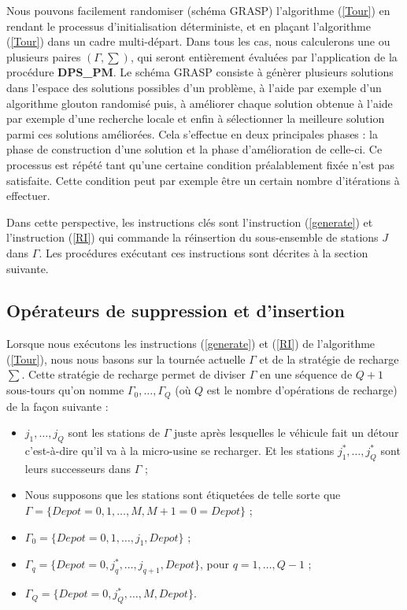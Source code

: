 {	
	Nous pouvons facilement randomiser (schéma GRASP) l'algorithme (\ref{Tour}) en rendant le processus d'initialisation déterministe, et en plaçant l'algorithme (\ref{Tour}) dans un cadre multi-départ. Dans tous les cas, nous calculerons une ou plusieurs paires $(\Gamma,\sum )$, qui seront entièrement évaluées par l'application de la procédure \textbf{DPS\_PM}. Le schéma GRASP consiste à génèrer plusieurs solutions dans l'espace des solutions possibles d'un problème, à l'aide par exemple d'un algorithme glouton randomisé puis, à améliorer chaque solution obtenue à l'aide par exemple d'une recherche locale et enfin à sélectionner la meilleure solution parmi ces solutions améliorées. Cela s'effectue en deux principales phases : la phase de
	construction d'une solution et la phase d'amélioration de celle-ci. Ce processus est répété
	tant qu'une certaine condition préalablement fixée n'est pas satisfaite. Cette condition
	peut par exemple être un certain nombre d'itérations à effectuer.
	
	Dans cette perspective, les instructions clés sont l'instruction (\ref{generate}) et l'instruction (\ref{RI}) qui commande la réinsertion du sous-ensemble de stations $J$ dans $\Gamma$. Les procédures exécutant ces instructions sont décrites à la section suivante.
	\subsection{Opérateurs de suppression et d'insertion}
	
	Lorsque nous exécutons les instructions (\ref{generate}) et (\ref{RI}) de l'algorithme (\ref{Tour}), nous nous basons sur la tournée actuelle $\Gamma$ et de la stratégie de recharge $\sum$. Cette stratégie de recharge permet de diviser $\Gamma$ en une séquence de $Q+1$ sous-tours qu'on nomme $\Gamma_0, \dots, \Gamma_Q$ (où $Q$ est le nombre d'opérations de recharge) de la façon suivante :
	\begin{itemize}[label=$\square$]
		\item $j_1, \dots, j_Q$ sont les stations de $\Gamma$ juste après lesquelles le véhicule fait un détour c'est-à-dire qu'il va à la micro-usine se recharger. Et les stations $j^*_1, \dots, j^*_Q$ sont leurs successeurs dans $\Gamma$ ;
		\item Nous supposons que les stations sont étiquetées de telle sorte que $\Gamma = \{Depot=0, 1, \dots, M, M+1=0=Depot \}$ ;
		\item $\Gamma_0 = \{Depot=0, 1, \dots, j_1, Depot\}$ ;
		\item $\Gamma_q = \{Depot=0, j^*_q, \dots, j_{q+1}, Depot\}$, pour $q=1, \dots, Q-1$ ;
		\item $\Gamma_Q=\{Depot=0, j^*_Q, \dots, M, Depot\}$. %
		

\end{itemize}}
